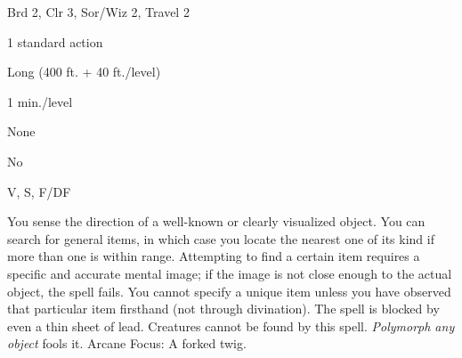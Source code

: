 
\begin{description*}
\item[Level:] Brd 2, Clr 3, Sor/Wiz 2, Travel 2
\item[Casting Time:] 1 standard action
\item[Range:] Long (400 ft. + 40 ft./level)
\item[Duration:] 1 min./level
\item[Saving Throw:] None
\item[Spell Resistance:] No
\item[Components:] V, S, F/DF
\end{description*}

You sense the direction of a well-known or clearly visualized object. You can search
for general items, in which case you locate the nearest one of its kind if more
than one is within range. Attempting to find a certain item requires a specific
and accurate mental image; if the image is not close enough to the actual object,
the spell fails. You cannot specify a unique item unless you have observed that
particular item firsthand (not through divination).
The spell is blocked by even a thin sheet of lead. Creatures cannot be found by
this spell. \textit{Polymorph any object} fools it.
Arcane Focus: A forked twig.